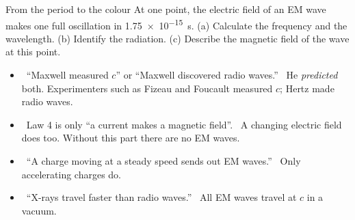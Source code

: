 \begin{workedexample}{From the period to the colour}\label{ch1:we:period}
At one point, the electric field of an EM wave makes one full oscillation in
\qty{1.75e-15}{s}. (a) Calculate the frequency and the wavelength. (b) Identify the radiation.
(c) Describe the magnetic field of the wave at this point.
\end{workedexample}

\begin{mistakes}
\begin{itemize}
  \item \xmark\ ``Maxwell measured $c$'' or ``Maxwell discovered radio waves.'' \cmark\ He
        \emph{predicted} both. Experimenters such as Fizeau and Foucault measured $c$; Hertz
        made radio waves.
  \item \xmark\ Law 4 is only ``a current makes a magnetic field''. \cmark\ A changing
        electric field does too. Without this part there are no EM waves.
  \item \xmark\ ``A charge moving at a steady speed sends out EM waves.'' \cmark\ Only
        accelerating charges do.
  \item \xmark\ ``X-rays travel faster than radio waves.'' \cmark\ All EM waves travel at $c$
        in a vacuum.
\end{itemize}
\end{mistakes}

